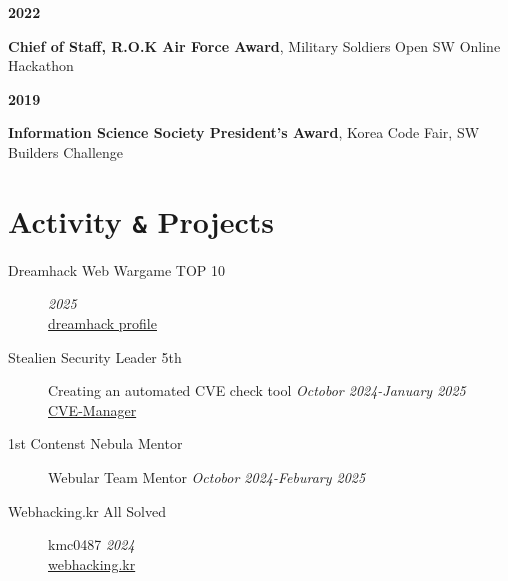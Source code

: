 \documentclass[margin,line]{resume}
\begin{document}
\begin{resume}
        \textbf{2022}
        \vspace{1mm}
        \begin{list2}
          \item \textbf{Chief of Staff, R.O.K Air Force Award}, Military Soldiers Open SW Online Hackathon
        \end{list2}
        
        \textbf{2019}
        \vspace{1mm}
        \begin{list2}
          \item \textbf{Information Science Society President's Award}, Korea Code Fair, SW Builders Challenge \\
        \end{list2}

    

 	    \section{\mysidestyle Activity \texttt{\&} Projects}\vspace{2mm}   	   
 	   
 	          
            \begin{description}   
                \item[Dreamhack Web Wargame TOP 10] \hfill \textsl{2025}\\
    				\href{https://dreamhack.io/users/17504}{dreamhack profile}
  			\vspace{2mm}

                \item[Stealien Security Leader 5th]\small{Creating an automated CVE check tool \hfill \textsl{Octobor 2024-January 2025}}\\
 				    \faGithub\space\href{https://github.com/minchan02/CVE-Manager}{CVE-Manager}
 			\vspace{2mm}
  	      		        
   		    \item[1st Contenst Nebula Mentor]\small{Webular Team Mentor \hfill \textsl{Octobor 2024-Feburary 2025}}\\ 	
 	      	\vspace{2mm}
   
    		\item[Webhacking.kr All Solved]\small{kmc0487 \hfill \textsl{2024}}\\
  	      		\href{webhacking.kr}{webhacking.kr}
 			\vspace{2mm}


\end{description}
\end{resume}
\end{document}
